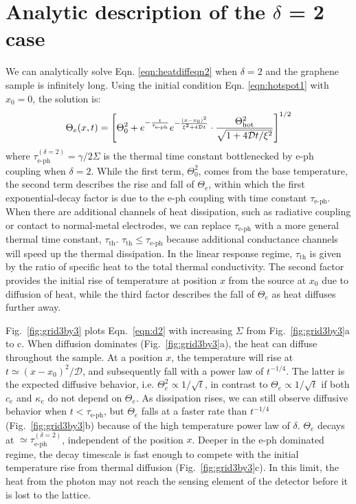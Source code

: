 \documentclass[aip, amsmath,amssymb, reprint]{revtex4-1}
\newcommand{\ba}{\begin{eqnarray}}
\newcommand{\ea}{\end{eqnarray}}
\begin{document}
\section{Analytic description of the $\delta$ = 2 case} \label{sec:d2}
We can analytically solve Eqn. \ref{eqn:heatdiffeqn2} when $\delta = 2$ and the graphene sample is infinitely long. Using the initial condition Eqn. \ref{eqn:hotspot1} with $x_0=0$, the solution is:
\ba\Theta_e(x, t) = \left[\Theta_0^2+e^{-\frac{t}{\tau_{\text{e-ph}}}}e^{-\frac{(x-x_0)^2}{\xi^2+4\mathcal{D}t}}\cdot\frac{\Theta^2_{\rm{hot}}}{\sqrt{1+4\mathcal{D}t/\xi^2}}\right]^{1/2}\label{eqn:d2}\ea
where $\tau_{\text{e-ph}}^{(\delta=2)} = \gamma/2\Sigma$ is the thermal time constant bottlenecked by e-ph coupling when $\delta = 2$. While the first term, $\Theta_0^2$, comes from the base temperature, the second term describes the rise and fall of $\Theta_e$, within which the first exponential-decay factor is due to the e-ph coupling with time constant $\tau_{\text{e-ph}}$. When there are additional channels of heat dissipation, such as radiative coupling or contact to normal-metal electrodes, we can replace $\tau_{\text{e-ph}}$ with a more general thermal time constant, $\tau_{\text{th}}$. $\tau_{\text{th}} \leq \tau_{\text{e-ph}}$ because additional conductance channels will speed up the thermal dissipation. In the linear response regime, $\tau_{\text{th}}$ is given by the ratio of specific heat to the total thermal conductivity\cite{Walsh.2017}. The second factor provides the initial rise of temperature at position $x$ from the source at $x_0$ due to diffusion of heat, while the third factor describes the fall of $\Theta_e$ as heat diffuses further away.

Fig.~\ref{fig:grid3by3} plots Eqn.\ \ref{eqn:d2} with increasing $\Sigma$ from Fig.~\ref{fig:grid3by3}a to c. When diffusion dominates (Fig.~\ref{fig:grid3by3}a), the heat can diffuse throughout the sample. At a position $x$, the temperature will rise at $t\simeq (x-x_0)^2/\mathcal{D}$, and subsequently fall with a power law of $t^{-1/4}$. The latter is the expected diffusive behavior, i.e. $\Theta_e^2 \propto 1/\sqrt{t}$, in contrast to $\Theta_e \propto 1/\sqrt{t}$ if both $c_e$ and $\kappa_e$ do not depend on $\Theta_e$. As dissipation rises, we can still observe diffusive behavior when $t<\tau_{\text{e-ph}}$, but $\Theta_e$ falls at a faster rate than $t^{-1/4}$ (Fig.~\ref{fig:grid3by3}b) because of the high temperature power law of $\delta$. $\Theta_e$ decays at $\simeq\tau_{\text{e-ph}}^{(\delta=2)}$, independent of the position $x$. Deeper in the e-ph dominated regime, the decay timescale is fast enough to compete with the initial temperature rise from thermal diffusion (Fig.~\ref{fig:grid3by3}c). In this limit, the heat from the photon may not reach the sensing element of the detector before it is lost to the lattice.
\end{document}
